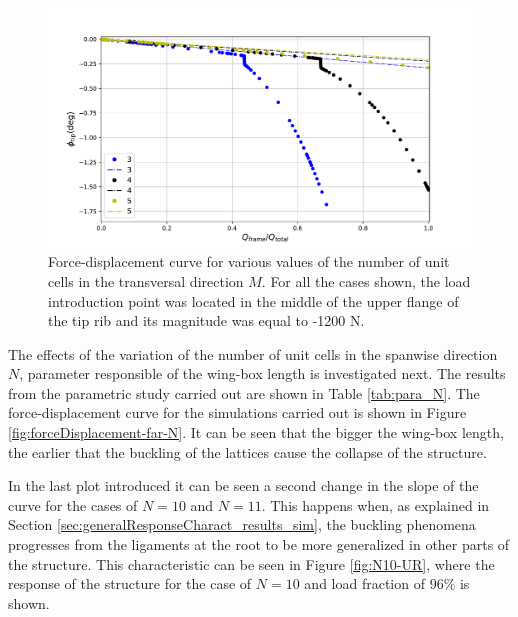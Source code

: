     \begin{figure}[!htpb] %
      \centering
      \includegraphics[width=0.8 \textwidth]{../figures/result-sim/M/force_displacement-far-1200N}
      \caption[Force-displacement curve for various values of the number of unit cells in the transversal direction]{Force-displacement curve for various values of the number of unit cells in the transversal direction $M$. For all the cases shown, the load introduction point was located in the middle of the upper flange of the tip rib and its magnitude was equal to -1200 N.}\label{fig:forceDisplacement-far-M}
    \end{figure}

    The effects of the variation of the number of unit cells in the spanwise direction $N$, parameter responsible of the wing-box length is investigated next. The results from the parametric study carried out are shown in Table \ref{tab:para_N}. The force-displacement curve for the simulations carried out is shown in Figure \ref{fig:forceDisplacement-far-N}. It can be seen that the bigger the wing-box length, the earlier that the buckling of the lattices cause the collapse of the structure. 

    In the last plot introduced it can be seen a second change in the slope of the curve for the cases of $N = 10$ and $N = 11$. This happens when, as explained in Section \ref{sec:generalResponseCharact_results_sim}, the buckling phenomena progresses from the ligaments at the root to be more generalized in other parts of the structure. This characteristic can be seen in Figure \ref{fig:N10-UR}, where the response of the structure for the case of $N = 10$ and load fraction of $96\%$ is shown.

